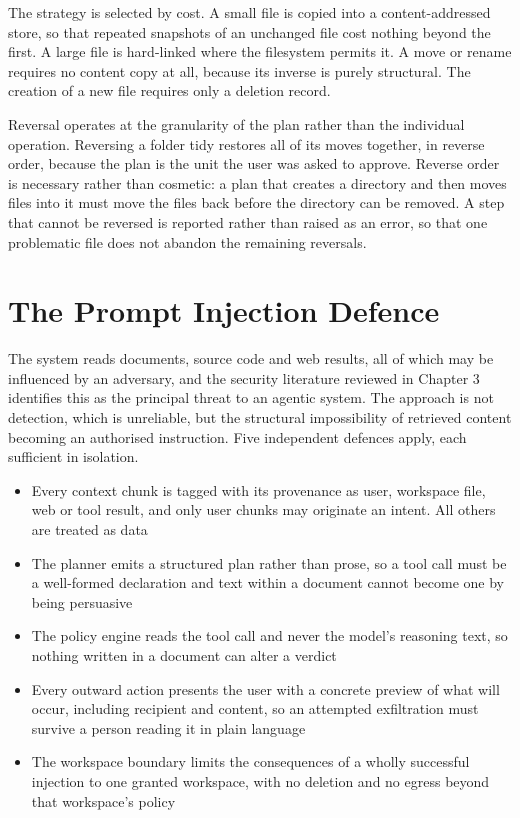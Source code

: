 \documentclass{FastFyp}
\begin{document}
The strategy is selected by cost. A small file is copied into a content-addressed store, so that repeated snapshots of an unchanged file cost nothing beyond the first. A large file is hard-linked where the filesystem permits it. A move or rename requires no content copy at all, because its inverse is purely structural. The creation of a new file requires only a deletion record.

Reversal operates at the granularity of the plan rather than the individual operation. Reversing a folder tidy restores all of its moves together, in reverse order, because the plan is the unit the user was asked to approve. Reverse order is necessary rather than cosmetic: a plan that creates a directory and then moves files into it must move the files back before the directory can be removed. A step that cannot be reversed is reported rather than raised as an error, so that one problematic file does not abandon the remaining reversals.

\section{The Prompt Injection Defence}
The system reads documents, source code and web results, all of which may be influenced by an adversary, and the security literature reviewed in Chapter 3 identifies this as the principal threat to an agentic system. The approach is not detection, which is unreliable, but the structural impossibility of retrieved content becoming an authorised instruction. Five independent defences apply, each sufficient in isolation.

\begin{itemize}
    \item Every context chunk is tagged with its provenance as user, workspace file, web or tool result, and only user chunks may originate an intent. All others are treated as data
    \item The planner emits a structured plan rather than prose, so a tool call must be a well-formed declaration and text within a document cannot become one by being persuasive
    \item The policy engine reads the tool call and never the model's reasoning text, so nothing written in a document can alter a verdict
    \item Every outward action presents the user with a concrete preview of what will occur, including recipient and content, so an attempted exfiltration must survive a person reading it in plain language
    \item The workspace boundary limits the consequences of a wholly successful injection to one granted workspace, with no deletion and no egress beyond that workspace's policy
\end{itemize}
\end{document}
